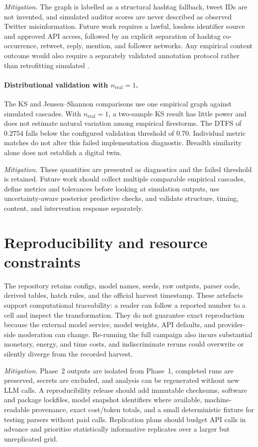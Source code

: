 \emph{Mitigation.}  The graph is labelled as a structural hashtag fallback,
tweet IDs are not invented, and simulated auditor scores are never described
as observed Twitter misinformation.  Future work requires a lawful,
lossless identifier source and approved API access, followed by an explicit
separation of hashtag co-occurrence, retweet, reply, mention, and follower
networks.  Any empirical content outcome would also require a separately
validated annotation protocol rather than retrofitting simulated \MPR{}.

\paragraph{Distributional validation with \(n_{\mathrm{real}}=1\).}
The KS and Jensen--Shannon comparisons use one empirical graph against
simulated cascades.  With \(n_{\mathrm{real}}=1\), a two-sample KS result has
little power and does not estimate natural variation among empirical
firestorms.  The DTFS of \(0.2754\) falls below the configured validation threshold of
\(0.70\). Individual metric matches do not alter this failed implementation
diagnostic.  Breadth similarity alone does not establish a
digital twin.

\emph{Mitigation.}  These quantities are presented as diagnostics and the
failed threshold is retained.  Future work should collect multiple comparable
empirical cascades, define metrics and tolerances before looking at simulation
outputs, use uncertainty-aware posterior predictive checks, and validate
structure, timing, content, and intervention response separately.

\section{Reproducibility and resource constraints}

The repository retains configs, model names, seeds, raw outputs, parser code,
derived tables, hatch rules, and the official harvest timestamp.  These
artefacts support computational traceability: a reader can follow a reported
number to a cell and inspect the transformation.  They do not guarantee exact
reproduction because the external model service, model weights, API defaults,
and provider-side moderation can change.  Re-running the full campaign also
incurs substantial monetary, energy, and time costs, and indiscriminate reruns
could overwrite or silently diverge from the recorded harvest.

\emph{Mitigation.}  Phase~2 outputs are isolated from Phase~1, completed runs
are preserved, secrets are excluded, and analysis can be regenerated without
new LLM calls.  A reproducibility release should add immutable checksums,
software and package lockfiles, model snapshot identifiers where available,
machine-readable provenance, exact cost/token totals, and a small deterministic
fixture for testing parsers without paid calls.  Replication plans should
budget API calls in advance and prioritise statistically informative
replicates over a larger but unreplicated grid.

